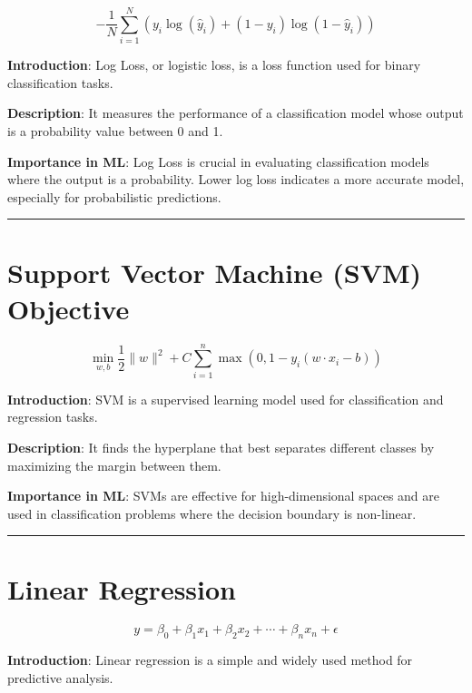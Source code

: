 \documentclass[
  12 pt,
  a4paper,
]{book}
\numberwithin{equation}{section}
\theoremstyle{plain}      %
\theoremstyle{definition} %
\theoremstyle{remark}     %
\theoremstyle{note}         %
\begin{document}
\[
-\frac{1}{N} \sum_{i=1}^N \left( y_i \log(\hat{y}_i) + (1 - y_i) \log(1 - \hat{y}_i) \right)
\]

\textbf{Introduction}: Log Loss, or logistic loss, is a loss function
used for binary classification tasks.

\textbf{Description}: It measures the performance of a classification
model whose output is a probability value between 0 and 1.

\textbf{Importance in ML}: Log Loss is crucial in evaluating
classification models where the output is a probability. Lower log loss
indicates a more accurate model, especially for probabilistic
predictions.

\begin{center}\rule{0.5\linewidth}{0.5pt}\end{center}

\newpage

\hypertarget{support-vector-machine-svm-objective}{%
\chapter{Support Vector Machine (SVM)
Objective}\label{support-vector-machine-svm-objective}}

\[
\min_{w, b} \frac{1}{2} \|w\|^2 + C \sum_{i=1}^n \max(0, 1 - y_i (w \cdot x_i - b))
\]

\textbf{Introduction}: SVM is a supervised learning model used for
classification and regression tasks.

\textbf{Description}: It finds the hyperplane that best separates
different classes by maximizing the margin between them.

\textbf{Importance in ML}: SVMs are effective for high-dimensional
spaces and are used in classification problems where the decision
boundary is non-linear.

\begin{center}\rule{0.5\linewidth}{0.5pt}\end{center}

\newpage

\hypertarget{linear-regression}{%
\chapter{Linear Regression}\label{linear-regression}}

\[
y = \beta_0 + \beta_1 x_1 + \beta_2 x_2 + \cdots + \beta_n x_n + \epsilon
\]

\textbf{Introduction}: Linear regression is a simple and widely used
method for predictive analysis.
\end{document}
